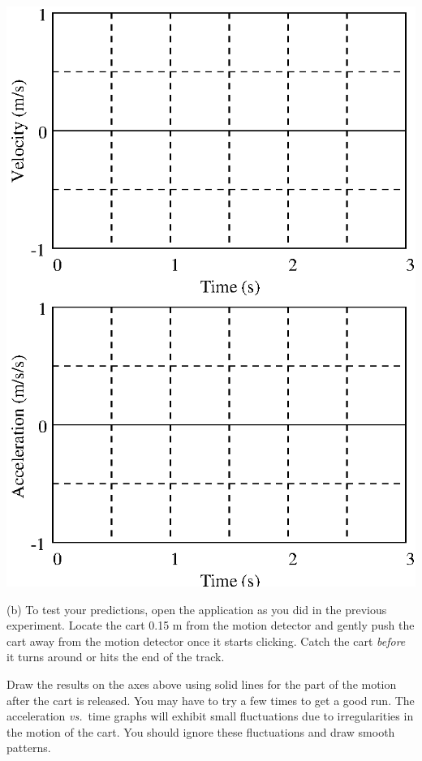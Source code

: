 \vspace{0.3cm}
{\par\centering \includegraphics{slowing/slowing_fig1.eps} \par}
\vspace{0.3cm}

(b) To test your predictions, open the  application as you did in the previous experiment. Locate the cart 0.15 m from the motion detector and gently push the cart away from the motion detector once it starts clicking. Catch the cart \textit{before} it turns around or hits the end of the track.

Draw the results on the axes above using solid lines for the part of the motion
after the cart is released. You may have to try a few times to get a good run.  The acceleration \textit{vs.}~time graphs will exhibit small fluctuations due to irregularities in the motion of the cart. You should ignore these fluctuations and draw smooth patterns.

